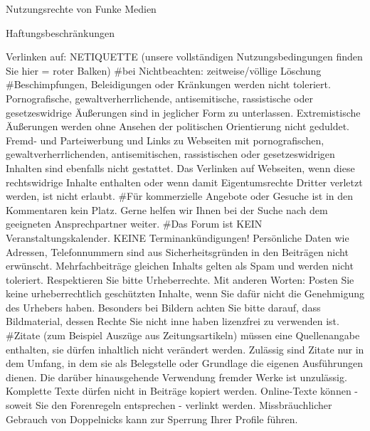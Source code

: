 Nutzungsrechte von Funke Medien 

Haftungsbeschränkungen



Verlinken auf:
NETIQUETTE (unsere vollständigen Nutzungsbedingungen finden Sie hier = roter Balken) 
#bei Nichtbeachten: zeitweise/völlige Löschung
    #Beschimpfungen, Beleidigungen oder Kränkungen werden nicht toleriert.
    Pornografische, gewaltverherrlichende, antisemitische, rassistische oder gesetzeswidrige Äußerungen sind in jeglicher Form zu unterlassen. Extremistische Äußerungen werden ohne Ansehen der politischen Orientierung nicht geduldet.
    Fremd- und Parteiwerbung und Links zu Webseiten mit pornografischen, gewaltverherrlichenden, antisemitischen, rassistischen oder gesetzeswidrigen Inhalten sind ebenfalls nicht gestattet.
    Das Verlinken auf Webseiten, wenn diese rechtswidrige Inhalte enthalten oder wenn damit Eigentumsrechte Dritter verletzt werden, ist nicht erlaubt.
    #Für kommerzielle Angebote oder Gesuche ist in den Kommentaren kein Platz. Gerne helfen wir Ihnen bei der Suche nach dem geeigneten Ansprechpartner weiter.
    #Das Forum ist KEIN Veranstaltungskalender. KEINE Terminankündigungen!
    Persönliche Daten wie Adressen, Telefonnummern sind aus Sicherheitsgründen in den Beiträgen nicht erwünscht.
    Mehrfachbeiträge gleichen Inhalts gelten als Spam und werden nicht toleriert.
    Respektieren Sie bitte Urheberrechte. Mit anderen Worten: Posten Sie keine urheberrechtlich geschützten Inhalte, wenn Sie dafür nicht die Genehmigung des Urhebers haben. Besonders bei Bildern achten Sie bitte darauf, dass Bildmaterial, dessen Rechte Sie nicht inne haben lizenzfrei zu verwenden ist.
    #Zitate (zum Beispiel Auszüge aus Zeitungsartikeln) müssen eine Quellenangabe enthalten, sie dürfen inhaltlich nicht verändert werden. Zulässig sind Zitate nur in dem Umfang, in dem sie als Belegstelle oder Grundlage die eigenen Ausführungen dienen. Die darüber hinausgehende Verwendung fremder Werke ist unzulässig. Komplette Texte dürfen nicht in Beiträge kopiert werden. Online-Texte können - soweit Sie den Forenregeln entsprechen - verlinkt werden.
    Missbräuchlicher Gebrauch von Doppelnicks kann zur Sperrung Ihrer Profile führen.